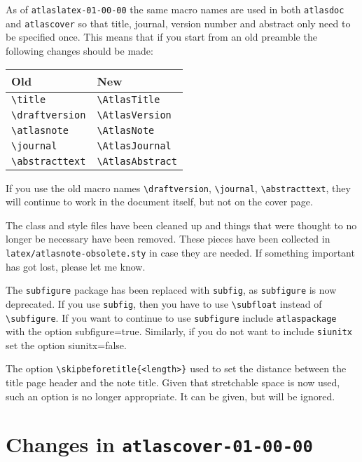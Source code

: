 \documentclass[atlasstyle,UKenglish]{latex/atlasdoc}
\newcommand{\File}[1]{\texttt{#1}\xspace}
\newcommand{\Macro}[1]{\texttt{\textbackslash #1}\xspace}
\newcommand{\Option}[1]{\textsf{#1}\xspace}
\newcommand{\Package}[1]{\texttt{#1}\xspace}
\begin{document}
As of \File{atlaslatex-01-00-00} the same macro names are used in both \Package{atlasdoc} and
\Package{atlascover} so that title, journal, version number and abstract only need to be specified once.
This means that if you start from an old preamble the following changes should be made:
\begin{center}
  \begin{tabular}{ll}
    Old	& New\\
    \midrule
    \Macro{title} & \Macro{AtlasTitle}\\
    \Macro{draftversion} & \Macro{AtlasVersion}\\
    \Macro{atlasnote} & \Macro{AtlasNote}\\
    \Macro{journal} & \Macro{AtlasJournal}\\
    \Macro{abstracttext} & \Macro{AtlasAbstract}
  \end{tabular}
\end{center}
If you use the old macro names 
\Macro{draftversion}, \Macro{journal}, \Macro{abstracttext},
they will continue to work in the document itself, but not on the cover page.

The class and style files have been cleaned up and things 
that were thought to no longer be necessary have been removed.
These pieces have been collected in \texttt{latex/atlasnote-obsolete.sty} in case they are needed.
If something important has got lost, please let me know.

The \Package{subfigure} package has been replaced with \Package{subfig}, as \Package{subfigure} is now deprecated.
If you use \Package{subfig}, then you have to use \Macro{subfloat} instead of \Macro{subfigure}.
If you want to continue to use \Package{subfigure} include \Package{atlaspackage} with the option
\Option{subfigure=true}. Similarly, if you do not want to include \Package{siunitx} set
the option \Option{siunitx=false}.

The option \verb|\skipbeforetitle{<length>}| used to set the distance between
the title page header and the note title. 
Given that stretchable space is now used, such an option is no longer appropriate.
It can be given, but will be ignored.


\section{Changes in \texttt{atlascover-01-00-00}}
\label{sec:oldcover}
\end{document}
